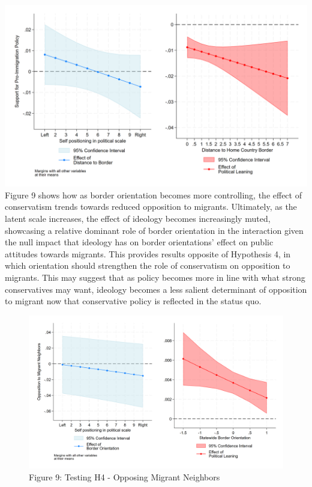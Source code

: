 \documentclass[12pt,]{article}
\begin{document}
\includegraphics{figures/m5_policy_marginal_1.png} Figure 9 shows how as
border orientation becomes more controlling, the effect of conservatism
trends towards reduced opposition to migrants. Ultimately, as the latent
scale increases, the effect of ideology becomes increasingly muted,
showcasing a relative dominant role of border orientation in the
interaction given the null impact that ideology has on border
orientations' effect on public attitudes towards migrants. This provides
results opposite of Hypothesis 4, in which orientation should strengthen
the role of conservatism on opposition to migrants. This may suggest
that as policy becomes more in line with what strong conservatives may
want, ideology becomes a less salient determinant of opposition to
migrant now that conservative policy is reflected in the status quo.

\begin{figure}
\centering
\includegraphics{figures/m6_marginal_1.png}
\caption{Figure 9: Testing H4 - Opposing Migrant Neighbors}
\end{figure}
\end{document}
